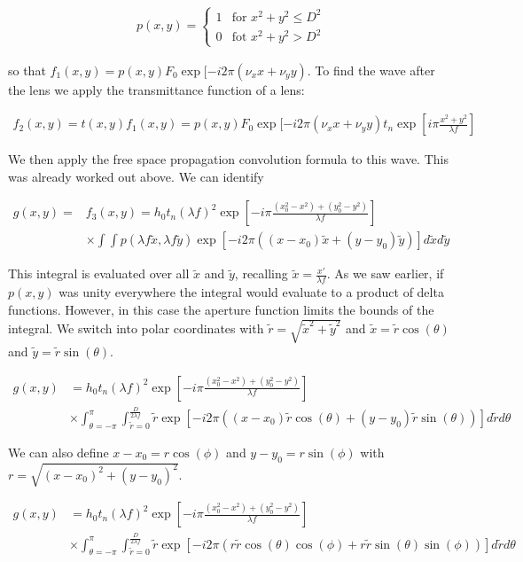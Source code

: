 \documentclass[12pt]{article}
\begin{document}
\begin{align}
p(x,y) =
\begin{cases}
1 & \text{for } x^2+y^2 \le D^2\\
0 & \text{fot } x^2+y^2 > D^2
\end{cases}
\end{align}

so that $f_1(x,y) = p(x,y)F_0 \exp[-i 2\pi (\nu_x x+\nu_y y)$. To find the wave after the lens we apply the transmittance function of a lens:


\begin{align}
f_2(x,y) = t(x,y)f_1(x,y) = p(x,y)F_0 \exp[-i 2\pi (\nu_x x+\nu_y y) t_n \exp\left[i \pi \frac{x^2+y^2}{\lambda f}\right]
\end{align}

We then apply the free space propagation convolution formula to this wave. This was already worked out above. We can identify

\begin{align}
g(x,y) =& f_3(x,y) = h_0 t_n (\lambda f)^2 \exp\left[-i\pi\frac{(x_0^2-x^2)+(y_0^2-y^2)}{\lambda f}\right]\\
&\times  \int \int p(\lambda f \tilde{x}, \lambda f \tilde{y}) \exp\left[-i2\pi((x-x_0) \tilde{x} + (y-y_0) \tilde{y})\right] d\tilde{x} d\tilde{y}
\end{align}

This integral is evaluated over all $\tilde{x}$ and $\tilde{y}$, recalling $\tilde{x} = \frac{x'}{\lambda f}$. As we saw earlier, if $p(x,y)$ was unity everywhere the integral would evaluate to a product of delta functions. However, in this case the aperture function limits the bounds of the integral. We switch into polar coordinates with $\tilde{r} = \sqrt{\tilde{x}^2 + \tilde{y}^2}$ and $\tilde{x} = \tilde{r}\cos(\theta)$ and $\tilde{y} = \tilde{r}\sin(\theta)$.

\begin{align}
g(x,y) &= h_0 t_n (\lambda f)^2 \exp\left[-i\pi\frac{(x_0^2-x^2)+(y_0^2-y^2)}{\lambda f}\right]\\
&\times  \int_{\theta = -\pi}^{ \pi} \int_{\tilde{r} = 0}^{\frac{D}{2\lambda f}} \tilde{r} \exp\left[-i2\pi((x-x_0) \tilde{r}\cos(\theta) + (y-y_0) \tilde{r} \sin(\theta))\right] d\tilde{r} d\theta
\end{align}

We can also define $x-x_0 = r \cos(\phi)$ and $y-y_0 = r \sin(\phi)$ with $r = \sqrt{(x-x_0)^2+(y-y_0)^2}$.

\begin{align}
g(x,y) &= h_0 t_n (\lambda f)^2 \exp\left[-i\pi\frac{(x_0^2-x^2)+(y_0^2-y^2)}{\lambda f}\right]\\
&\times  \int_{\theta = -\pi}^{ \pi} \int_{\tilde{r} = 0}^{\frac{D}{2\lambda f}} \tilde{r} \exp\left[-i2\pi(r \tilde{r}\cos(\theta)\cos(\phi) + r \tilde{r} \sin(\theta)\sin(\phi))\right] d\tilde{r} d\theta
\end{align}
\end{document}
